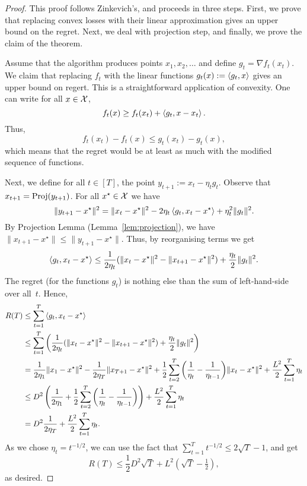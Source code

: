 \begin{proof}
    This proof follows Zinkevich's, and proceeds in three steps. First, we prove that replacing convex losses with their linear approximation gives an upper bound on the regret. Next, we deal with projection step, and finally, we prove the claim of the theorem.

    Assume that the algorithm produces points $x_1, x_2,\ldots$ and define $g_t = \nabla f_t(x_t)$. We claim that replacing $f_t$ with the linear functions $g_t(x) := \left\langle g_t,x \right\rangle$ gives an upper bound on regert. This is a straightforward application of convexity. One can write for all $x\in\mathcal{X}$,
    \[
        f_t(x) \geq f_t(x_t) + \left\langle g_t,x- x_t \right\rangle.
    \]
Thus,
\[
    f_t(x_t) - f_t(x) \leq g_t(x_t) - g_t(x),
\]
which means that the regret would be at least as much with the modified sequence of functions. 

Next, we define for all $t\in[T]$, the point $y_{t+1} := x_t - \eta_t g_t$. Observe that $x_{t+1} = \operatorname{Proj}(y_{t+1})$. For all $x^\star \in \mathcal{X}$ we have
\[
    \|y_{t+1} - x^\star\|^2 = \|x_t - x^\star\|^2 - 2\eta_t \left\langle g_t,x_t - x^\star \right\rangle + \eta_t^2 \|g_t\|^2.
\]
By Projection Lemma (Lemma~\ref{lem:projection}), we have $\|x_{t+1} - x^\star\| \leq \|y_{t+1} - x^\star\|$. Thus, by reorganising terms we get
\[
    \left\langle g_t,x_t - x^\star \right\rangle \leq \frac{1}{2\eta_t}(\|x_t - x^\star\|^2 - \|x_{t+1} - x^\star\|^2) + \frac{\eta_t}{2} \|g_t\|^2.
\]
The regret (for the functions $g_t$) is nothing else than the sum of left-hand-side over all~$t$. Hence, 
\begin{align*}
    R(T) &\leq \sum_{t=1}^T \left\langle g_t,x_t - x^\star \right\rangle \\
         &\leq \sum_{t=1}^T \bigg(\frac{1}{2\eta_t}(\|x_t - x^\star\|^2 - \|x_{t+1} - x^\star\|^2) + \frac{\eta_t}{2} \|g_t\|^2\bigg) \\
         &= \frac{1}{2\eta_1}\|x_1 - x^\star\|^2 - \frac{1}{2\eta_T}\|x_{T+1} - x^\star\|^2 + \frac{1}{2}\sum_{t=2}^T \bigg(\frac{1}{\eta_t} - \frac{1}{\eta_{t-1}}\bigg)\|x_t - x^\star\|^2 + \frac{L^2}{2} \sum_{t=1}^T \eta_t \\
         &\leq D^2\left(\frac{1}{2\eta_1} +  \frac{1}{2}\sum_{t=2}^T \left(\frac{1}{\eta_t} - \frac{1}{\eta_{t-1}}\right)  \right) + \frac{L^2}{2} \sum_{t=1}^T \eta_t \\
         &=D^2\frac{1}{2\eta_T} + \frac{L^2}{2} \sum_{t=1}^T \eta_t.
\end{align*}
As we chose $\eta_t = t^{-1/2}$, we can use the fact that $\sum_{t=1}^T t^{-1/2} \leq 2\sqrt{T} - 1$, and get
\[
    R(T) \leq \frac{1}{2}D^2\sqrt{T} + L^2(\sqrt{T} - \tfrac{1}{2}),
\]
as desired.
\end{proof}

